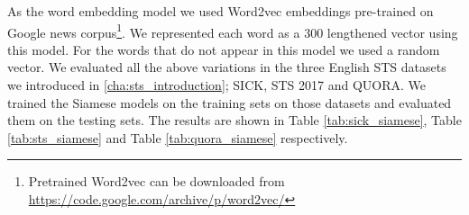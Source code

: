 	
	As the word embedding model we used Word2vec embeddings \cite{DBLP:journals/corr/abs-1301-3781} pre-trained on Google news corpus\footnote{Pretrained Word2vec can be downloaded from \url{https://code.google.com/archive/p/word2vec/}}. We represented each word as a 300 lengthened vector using this model. For the words that do not appear in this model we used a random vector. 
	We evaluated all the above variations in the three English STS datasets we introduced in \ref{cha:sts_introduction}; SICK, STS 2017 and QUORA. We trained the Siamese models on the training sets on those datasets and evaluated them on the testing sets. The results are shown in Table \ref{tab:sick_siamese}, Table \ref{tab:sts_siamese} and Table \ref{tab:quora_siamese} respectively. 
	
	 
	\begin{table}[htb]
		\centering
		\caption[Results for SICK with Siamese Neural Network]{Results for SICK dataset with different variants of Siamese Neural Network. For each variant, Pearson Correlation ($\bm{\rho}$) and Spearman Correlation ($\bm{\tau}$) are reported between the predicted values and the gold labels of the test set. Best result from all the variations is marked with ${\dagger}$.}  
		\label{tab:sick_siamese}
	\end{table}
	
